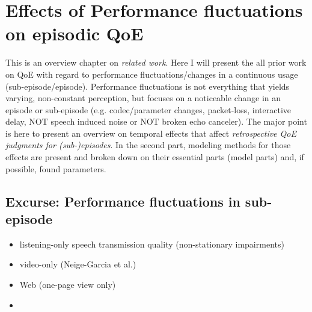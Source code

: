 \chapter{Effects of Performance fluctuations on episodic QoE}\label{chap:04}
\begin{chapter-abstract}
This is an overview chapter on \textit{related work}.
Here I will present the all prior work on QoE with regard to performance fluctuations/changes in a continuous usage (sub-episode/episode).
Performance fluctuations is not everything that yields varying, non-constant perception, but focuses on a noticeable change in an episode or sub-episode (e.g. codec/parameter changes, packet-loss, interactive delay, NOT speech induced noise or NOT broken echo canceler).
The major point is here to present an overview on temporal effects that affect \textit{retrospective QoE judgments for (sub-)episodes}.
In the second part, modeling methods for those effects are present and broken down on their essential parts (model parts) and, if possible, found parameters.






\end{chapter-abstract}




\section{Excurse: Performance fluctuations in sub-episode} %
\begin{itemize}
\item listening-only speech transmission quality (non-stationary impairments)
\item video-only (Neige-Garcia et al.)
\item Web (one-page view only)
\item \cite{hands_recency_2001}
\end{itemize}


